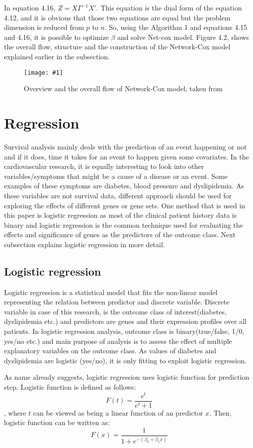 \documentclass{ba-kecs}
\numberwithin{figure}{section}
\numberwithin{equation}{section}
\newcommand{\dkepic}[2]{ %
	\begin{figure}[H] %
	\texttt{[image: \#1]}
	\caption{#2}
	\label{#1}
	\end{figure}
}
\begin{document}
In equation 4.16, $Z = X\Gamma^{-1}X'$. This equation is the dual form of the equation 4.12, and it is obvious that those two equations are equal but the problem dimension is reduced from $p$ to $n$. So, using the Algorithm 1 and equations 4.15 and 4.16, it is possible to optimize $\beta$ and solve Net-cox model. Figure 4.2, shows the overall flow, structure and the construction of the Network-Cox model explained earlier in the subsection.

\dkepic{netcox}{Overview and the overall flow of Network-Cox model, taken from \cite{netcox}}


\section{Regression}
Survival analysis mainly deals with the prediction of an event happening or not and if it does, time it takes for an event to happen given some covariates. In the cardiovascular research, it is equally interesting to look into other variables/symptoms that might be a cause of a disease or an event. Some examples of these symptoms are diabetes, blood pressure and dyslipidemia. As these variables are not survival data, different approach should be used for exploring the effects of different genes or gene sets. One method that is used in this paper is logistic regression as most of the clinical patient history data is binary and logistic regression is the common technique used for evaluating the effects and significance of genes as the predictors of the outcome class. Next subsection explains logistic regression in more detail.

\subsection{Logistic regression}
Logistic regression is a statistical model that fits the non-linear model representing the relation between predictor and discrete variable. Discrete variable in case of this research, is the outcome class of interest(diabetes, dyslipidemia etc.) and predictors are genes and their expression profiles over all patients. In logistic regression analysis, outcome class is binary(true/false, 1/0, yes/no etc.) and main purpose of analysis is to assess the effect of multiple explanatory variables on the outcome class. As values of diabetes and dyslipidemia are logistic (yes/no), it is only fitting to exploit logistic regression.

As name already suggests, logistic regression uses logistic function for prediction step. Logistic function is defined as follows:
\begin{equation}
F(t) = \dfrac{e^{t}}{e^{t} + 1}
\end{equation}
, where $t$ can be viewed as being a linear function of an predictor $x$. Then, logistic function can be written as:
\begin{equation}
F(x) = \dfrac{1}{1 + e^{-(\beta_{0} + \beta_{1}x)}}
\end{equation}
\end{document}
